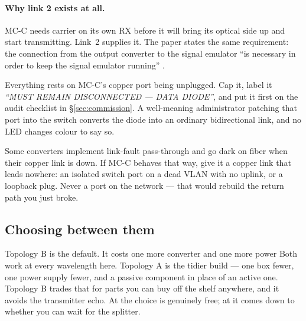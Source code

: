 \documentclass[11pt,a4paper]{article}
\begin{document}
\paragraph{Why link 2 exists at all.} MC-C needs carrier on its own RX before
it will bring its optical side up and start transmitting. Link~2 supplies it.
The paper states the same requirement: the connection from the output
converter to the signal emulator ``is necessary in order to keep the signal
emulator running'' \cite{anton2024}.

\begin{warnbox}
Everything rests on MC-C's copper port being unplugged. Cap it, label it
\emph{``MUST REMAIN DISCONNECTED --- DATA DIODE''}, and put it first on the
audit checklist in \S\ref{sec:commission}. A well-meaning administrator
patching that port into the \srcside{} switch converts the diode into an
ordinary bidirectional link, and no LED changes colour to say so.
\end{warnbox}

\begin{tipbox}
Some converters implement link-fault pass-through and go dark on fiber when
their copper link is down. If MC-C behaves that way, give it a copper link
that leads nowhere: an isolated switch port on a dead VLAN with no uplink, or
a loopback plug. Never a port on the \srcside{} network --- that would rebuild
the return path you just broke.
\end{tipbox}

\subsection{Choosing between them}

Topology B is the default. It costs one more converter and one more power
Both work at every wavelength here. Topology A is the tidier build --- one
box fewer, one power supply fewer, and a passive component in place of an
active one. Topology B trades that for parts you can buy off the shelf
anywhere, and it avoids the transmitter echo. At  the choice is
genuinely free; at  it comes down to whether you can wait for the
splitter.
\end{document}
